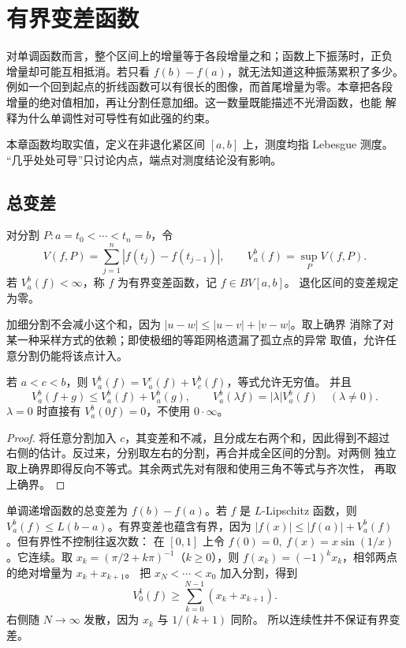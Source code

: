 \chapter{有界变差函数}
\label{chap:bounded-variation}

对单调函数而言，整个区间上的增量等于各段增量之和；函数上下振荡时，正负
增量却可能互相抵消。若只看 \(f(b)-f(a)\)，就无法知道这种振荡累积了多少。
例如一个回到起点的折线函数可以有很长的图像，而首尾增量为零。本章把各段
增量的绝对值相加，再让分割任意加细。这一数量既能描述不光滑函数，也能
解释为什么单调性对可导性有如此强的约束。

本章函数均取实值，定义在非退化紧区间 \([a,b]\) 上，测度均指 Lebesgue 测度。
“几乎处处可导”只讨论内点，端点对测度结论没有影响。

\section{总变差}

\begin{definition}
对分割 \(P:a=t_0<\cdots<t_n=b\)，令
\[
 V(f,P)=\sum_{j=1}^n|f(t_j)-f(t_{j-1})|,\qquad
 V_a^b(f)=\sup_P V(f,P).
\]
若 \(V_a^b(f)<\infty\)，称 \(f\) 为有界变差函数，记 \(f\in BV[a,b]\)。
退化区间的变差规定为零。
\end{definition}

加细分割不会减小这个和，因为 \(|u-w|\le |u-v|+|v-w|\)。取上确界
消除了对某一种采样方式的依赖；即使极细的等距网格遗漏了孤立点的异常
取值，允许任意分割仍能将该点计入。

\begin{proposition}\label{prop:variation-additive}
若 \(a<c<b\)，则 \(V_a^b(f)=V_a^c(f)+V_c^b(f)\)，等式允许无穷值。
并且
\[
 V_a^b(f+g)\le V_a^b(f)+V_a^b(g),\qquad
 V_a^b(\lambda f)=|\lambda|V_a^b(f)\quad(\lambda\ne0).
\]
\(\lambda=0\) 时直接有 \(V_a^b(0f)=0\)，不使用 \(0\cdot\infty\)。
\end{proposition}
\begin{proof}
将任意分割加入 \(c\)，其变差和不减，且分成左右两个和，因此得到不超过
右侧的估计。反过来，分别取左右的分割，再合并成全区间的分割。对两侧
独立取上确界即得反向不等式。其余两式先对有限和使用三角不等式与齐次性，
再取上确界。
\end{proof}

单调递增函数的总变差为 \(f(b)-f(a)\)。若 \(f\) 是 \(L\)-Lipschitz
函数，则 \(V_a^b(f)\le L(b-a)\)。有界变差也蕴含有界，因为
\(|f(x)|\le |f(a)|+V_a^b(f)\)。但有界性不控制往返次数：
在 \([0,1]\) 上令 \(f(0)=0,\ f(x)=x\sin(1/x)\)。它连续。取
\(x_k=(\pi/2+k\pi)^{-1}\)（\(k\ge0\)），则
\(f(x_k)=(-1)^kx_k\)，相邻两点的绝对增量为 \(x_k+x_{k+1}\)。
把 \(x_N<\cdots<x_0\) 加入分割，得到
\[
 V_0^1(f)\ge\sum_{k=0}^{N-1}(x_k+x_{k+1}).
\]
右侧随 \(N\to\infty\) 发散，因为 \(x_k\) 与 \(1/(k+1)\) 同阶。
所以连续性并不保证有界变差。

